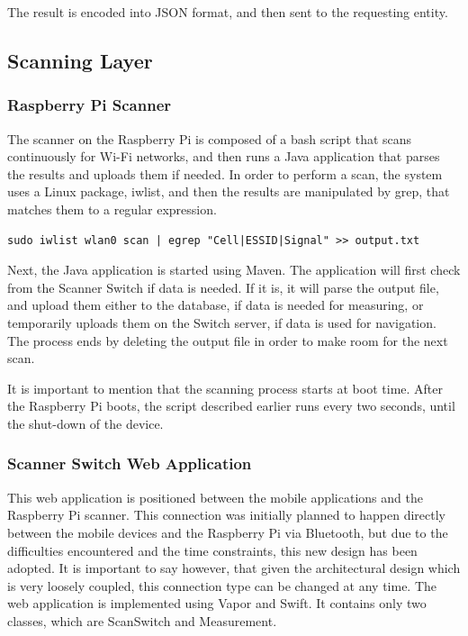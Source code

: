 The result is encoded into JSON format, and then sent to the requesting entity.

\subsection{Scanning Layer}
\subsubsection{Raspberry Pi Scanner}
The scanner on the Raspberry Pi is composed of a bash script that scans continuously for Wi-Fi networks, and then runs a Java application that parses the results and uploads them if needed. In order to perform a scan, the system uses a Linux package, iwlist, and then the results are manipulated by grep, that matches them to a regular expression.
\begin{lstlisting}
sudo iwlist wlan0 scan | egrep "Cell|ESSID|Signal" >> output.txt
\end{lstlisting}

\noindent
Next, the Java application is started using Maven. The application will first check from the Scanner Switch if data is needed. If it is, it will parse the output file, and upload them either to the database, if data is needed for measuring, or temporarily uploads them on the Switch server, if data is used for navigation. The process ends by deleting the output file in order to make room for the next scan.

It is important to mention that the scanning process starts at boot time. After the Raspberry Pi boots, the script described earlier runs every two seconds, until the shut-down of the device.

\subsubsection{Scanner Switch Web Application}
This web application is positioned between the mobile applications and the Raspberry Pi scanner. This connection was initially planned to happen directly between the mobile devices and the Raspberry Pi via Bluetooth, but due to the difficulties encountered and the time constraints, this new design has been adopted. It is important to say however, that given the architectural design which is very loosely coupled, this connection type can be changed at any time. The web application is implemented using Vapor and Swift. It contains only two classes, which are ScanSwitch and Measurement. 

